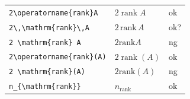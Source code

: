 \documentclass[preview]{standalone}
\newcommand{\tA}[1]{\textcolor{cA}{#1}}
\newcommand{\tC}[1]{\textcolor{cC}{#1}}
\newcommand{\tD}[1]{\textcolor{cD}{#1}}
\begin{document}
\begin{table}[h]
	\centering
	\begin{tabular}{lll}
		\verb|2\operatorname{rank}A|   & $2\operatorname{rank}A$   & \tA{ok}  \\
		\verb|2\,\mathrm{rank}\,A|     & $2\,\mathrm{rank}\,A$     & \tC{ok?} \\
		\verb|2 \mathrm{rank} A|       & $2  \mathrm{rank} A$      & \tD{ng}  \\[0.5em]
		\verb|2\operatorname{rank}(A)| & $2\operatorname{rank}(A)$ & \tA{ok}  \\
		\verb|2 \mathrm{rank}(A)|      & $2  \mathrm{rank}(A)$     & \tD{ng}  \\[0.5em]
		\verb|n_{\mathrm{rank}}|       & $n_{\mathrm{rank}}$       & \tA{ok}  \\
	\end{tabular}
\end{table}
\end{document}
